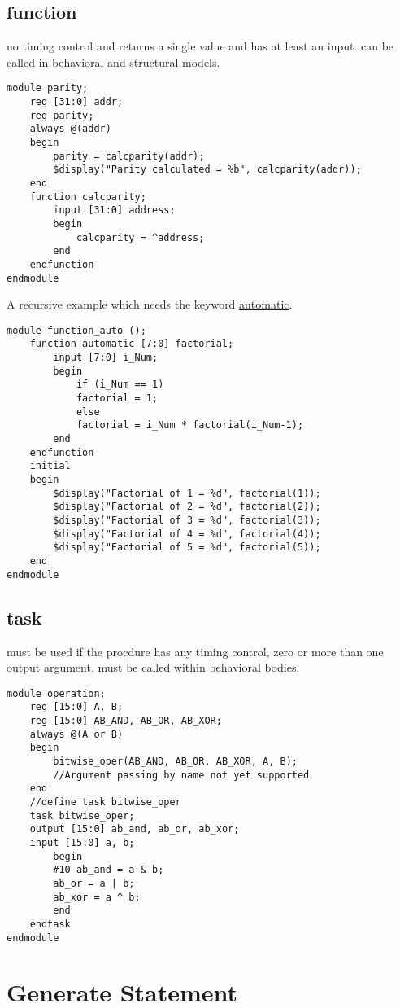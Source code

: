\subsection{function}
no timing control and returns a single value and has at least an input. can be called in behavioral and structural models.
\begin{lstlisting}
module parity;
    reg [31:0] addr;
    reg parity;
    always @(addr)
    begin
        parity = calcparity(addr); 
        $display("Parity calculated = %b", calcparity(addr));
    end
    function calcparity;
        input [31:0] address;
        begin
            calcparity = ^address; 
        end
    endfunction
endmodule   
\end{lstlisting}
\begin{example}
    A recursive example which needs the keyword \underline{automatic}.
    \begin{lstlisting}
module function_auto ();
    function automatic [7:0] factorial;
        input [7:0] i_Num; 
        begin
            if (i_Num == 1)
            factorial = 1; 
            else
            factorial = i_Num * factorial(i_Num-1);
        end
    endfunction
    initial
    begin
        $display("Factorial of 1 = %d", factorial(1));
        $display("Factorial of 2 = %d", factorial(2));
        $display("Factorial of 3 = %d", factorial(3));
        $display("Factorial of 4 = %d", factorial(4));
        $display("Factorial of 5 = %d", factorial(5));
    end
endmodule
    \end{lstlisting}
\end{example}

\subsection{task}
must be used if the procdure has any timing control, zero or more than one output argument. must be called within behavioral bodies.
\begin{lstlisting}
module operation;
    reg [15:0] A, B;
    reg [15:0] AB_AND, AB_OR, AB_XOR;
    always @(A or B) 
    begin
        bitwise_oper(AB_AND, AB_OR, AB_XOR, A, B);
        //Argument passing by name not yet supported
    end
    //define task bitwise_oper
    task bitwise_oper;
    output [15:0] ab_and, ab_or, ab_xor; 
    input [15:0] a, b; 
        begin
        #10 ab_and = a & b;
        ab_or = a | b;
        ab_xor = a ^ b;
        end
    endtask
endmodule
\end{lstlisting}
\section{Generate Statement}
